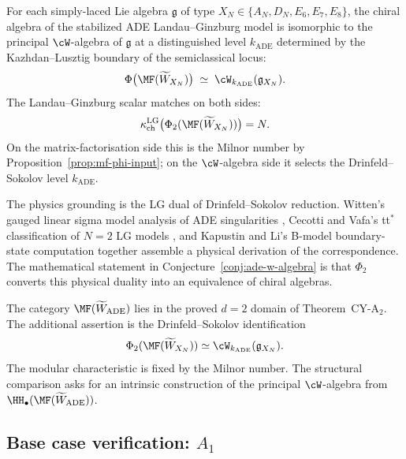 \begin{conjecture}
\label{conj:ade-w-algebra}
\ClaimStatusConjectured
For each simply-laced Lie algebra $\mathfrak{g}$ of type $X_N \in \{A_N, D_N, E_6, E_7, E_8\}$, the chiral algebra of the stabilized ADE Landau--Ginzburg model is isomorphic to the principal $\cW$-algebra of $\mathfrak{g}$ at a distinguished level $k_{\mathrm{ADE}}$ determined by the Kazhdan--Lusztig boundary of the semiclassical locus:
\[
 \Phi\bigl(\MF(\widetilde{W}_{X_N})\bigr) \;\simeq\; \cW_{k_{\mathrm{ADE}}}(\mathfrak{g}_{X_N}) .
\]
The Landau--Ginzburg scalar matches on both sides:
\[
\kappa_{\mathrm{ch}}^{\mathrm{LG}}\bigl(\Phi_2(\MF(\widetilde{W}_{X_N}))\bigr)=N .
\]
On the matrix-factorisation side this is the Milnor number by Proposition~\ref{prop:mf-phi-input}; on the $\cW$-algebra side it selects the Drinfeld--Sokolov level $k_{\mathrm{ADE}}$.
\end{conjecture}

The physics grounding is the LG dual of Drinfeld--Sokolov reduction. Witten's gauged linear sigma model analysis of ADE singularities \cite{Witten1993}, Cecotti and Vafa's tt$^*$ classification of $N = 2$ LG models \cite{CecottiVafa1993}, and Kapustin and Li's B-model boundary-state computation \cite{KapustinLi2003} together assemble a physical derivation of the correspondence. The mathematical statement in Conjecture~\ref{conj:ade-w-algebra} is that $\Phi_2$ converts this physical duality into an equivalence of chiral algebras.

\begin{remark}
\label{rem:ade-conj-scope}
The category $\MF(\widetilde{W}_{\mathrm{ADE}})$ lies in the proved \(d=2\) domain of Theorem~CY-A$_2$. The additional assertion is the Drinfeld--Sokolov identification
\[
\Phi_2(\MF(\widetilde{W}_{X_N})) \simeq \cW_{k_{\mathrm{ADE}}}(\mathfrak g_{X_N}).
\]
The modular characteristic is fixed by the Milnor number. The structural comparison asks for an intrinsic construction of the principal $\cW$-algebra from $\HH_\bullet(\MF(\widetilde{W}_{\mathrm{ADE}}))$.
\end{remark}

\subsection*{Base case verification: \texorpdfstring{$A_1$}{A-1}}

